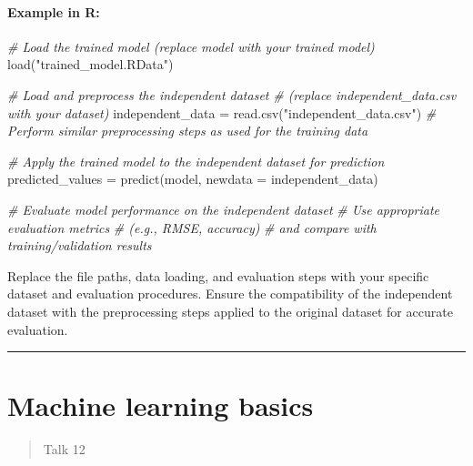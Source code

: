 \documentclass[
]{article}
\newenvironment{Shaded}{}{}
\newcommand{\AttributeTok}[1]{\textcolor[rgb]{0.49,0.56,0.16}{#1}}
\newcommand{\CommentTok}[1]{\textcolor[rgb]{0.38,0.63,0.69}{\textit{#1}}}
\newcommand{\FunctionTok}[1]{\textcolor[rgb]{0.02,0.16,0.49}{#1}}
\newcommand{\NormalTok}[1]{#1}
\newcommand{\OtherTok}[1]{\textcolor[rgb]{0.00,0.44,0.13}{#1}}
\newcommand{\StringTok}[1]{\textcolor[rgb]{0.25,0.44,0.63}{#1}}
\begin{document}
\hypertarget{example-in-r}{%
\paragraph{Example in R:}\label{example-in-r}}

\begin{Shaded}
\begin{Highlighting}[]
\CommentTok{\# Load the trained model (replace \textquotesingle{}model\textquotesingle{} with your trained model)}
\FunctionTok{load}\NormalTok{(}\StringTok{"trained\_model.RData"}\NormalTok{)}

\CommentTok{\# Load and preprocess the independent dataset }
\CommentTok{\# (replace \textquotesingle{}independent\_data.csv\textquotesingle{} with your dataset)}
\NormalTok{independent\_data }\OtherTok{=} \FunctionTok{read.csv}\NormalTok{(}\StringTok{"independent\_data.csv"}\NormalTok{)}
\CommentTok{\# Perform similar preprocessing steps as used for the training data}

\CommentTok{\# Apply the trained model to the independent dataset for prediction}
\NormalTok{predicted\_values }\OtherTok{=} \FunctionTok{predict}\NormalTok{(model, }\AttributeTok{newdata =}\NormalTok{ independent\_data)}

\CommentTok{\# Evaluate model performance on the independent dataset}
\CommentTok{\# Use appropriate evaluation metrics }
\CommentTok{\# (e.g., RMSE, accuracy) }
\CommentTok{\# and compare with training/validation results}
\end{Highlighting}
\end{Shaded}

Replace the file paths, data loading, and evaluation steps with your
specific dataset and evaluation procedures. Ensure the compatibility of
the independent dataset with the preprocessing steps applied to the
original dataset for accurate evaluation.

\begin{center}\rule{0.5\linewidth}{0.5pt}\end{center}

\newpage
\hypertarget{machine-learning-basics}{%
\section{Machine learning basics}\label{machine-learning-basics}}

\begin{quote}
Talk 12
\end{quote}
\end{document}
